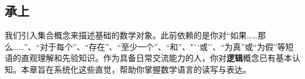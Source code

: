 \subsection{承上}

我们引入集合概念来描述基础的数学对象。此前依赖的是你对``如果……那么……''、``对于每个''、``存在''、``至少一个''、``和''、"``或''、``为真''或``为假''等短语的直观理解和先验知识。作为具备日常交流能力的人，你对\textbf{逻辑}概念已有基本认知。本章旨在系统化这些直觉，帮助你掌握数学语言的读写与表达。
